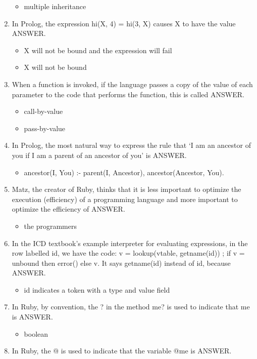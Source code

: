 \documentclass{exam}
\begin{document}
\begin{enumerate}
\begin{itemize}
\item multiple inheritance
\end{itemize}
\item In Prolog, the expression hi(X, 4) = hi(3, X) causes X to have the value ANSWER.
\begin{itemize}
\item X will not be bound and the expression will fail
\item X will not be bound
\end{itemize}
\item When a function is invoked, if the language passes a copy of the value of each parameter to the code that performs the function, this is called ANSWER.
\begin{itemize}
\item call-by-value
\item pass-by-value
\end{itemize}
\item In Prolog, the most natural way to express the rule that `I am an ancestor of you if I am a parent of an ancestor of you' is ANSWER.
\begin{itemize}
\item ancestor(I, You) :- parent(I, Ancestor), ancestor(Ancestor, You). 
\end{itemize}
\item Matz, the creator of Ruby, thinks that it is less important to optimize the execution (efficiency) of a programming language and more important to optimize the efficiency of ANSWER.
\begin{itemize}
\item the programmers
\end{itemize}
\item In the ICD textbook's example interpreter for evaluating expressions, in the row labelled id, we have the code: v = lookup(vtable, getname(id)) ; if v = unbound then error() else v.  It says getname(id) instead of id, because ANSWER.
\begin{itemize}
\item id indicates a token with a type and value field
\end{itemize}
\item In Ruby, by convention, the ? in the method me? is used to indicate that me is ANSWER.
\begin{itemize}
\item boolean
\end{itemize}
\item In Ruby, the @ is used to indicate that the variable @me is ANSWER.

\end{enumerate}
\end{document}
